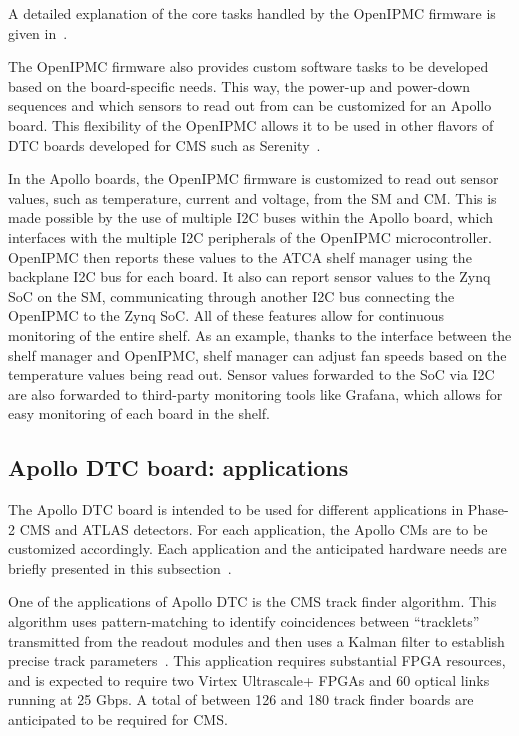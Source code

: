 A detailed explanation of the core tasks handled by the OpenIPMC firmware is given in~\cite{Calligaris:OpenIPMC}.

The OpenIPMC firmware also provides custom software tasks to be developed based on the board-specific needs.
This way, the power-up and power-down sequences and which sensors to read out from can be customized for an
Apollo board. This flexibility of the OpenIPMC allows it to be used in other flavors of DTC boards developed
for CMS such as Serenity~\cite{CMS:SerenityPaper}.

In the Apollo boards, the OpenIPMC firmware is customized to read out sensor values, such as temperature, 
current and voltage, from the SM and CM. 
This is made possible by the use of multiple I2C buses within the Apollo board, which
interfaces with the multiple I2C peripherals of the OpenIPMC microcontroller. OpenIPMC then reports these
values to the ATCA shelf manager using the backplane I2C bus for each board. It also can report sensor values
to the Zynq SoC on the SM, communicating through another I2C bus connecting the OpenIPMC to the Zynq SoC. 
All of these features allow for continuous 
monitoring of the entire shelf. As an example, thanks to the interface between the shelf manager and OpenIPMC,
shelf manager can adjust fan speeds based on the temperature values being read out. Sensor values forwarded to
the SoC via I2C are also forwarded to third-party monitoring tools like Grafana, which allows for easy monitoring
of each board in the shelf. 

\subsection{Apollo DTC board: applications}

The Apollo DTC board is intended to be used for different applications in Phase-2 CMS and ATLAS detectors.
For each application, the Apollo CMs are to be customized accordingly. Each application and the anticipated
hardware needs are briefly presented in this subsection~\cite{CMS:ApolloPaper}.

One of the applications of Apollo DTC is the CMS track finder algorithm. This algorithm uses 
pattern-matching to identify coincidences between “tracklets”
transmitted from the readout modules and then uses a Kalman filter to establish precise track 
parameters~\cite{CMS:ApolloPaper}. This application requires substantial FPGA resources, and is expected
to require two Virtex Ultrascale+ FPGAs and 60 optical links running at 25 Gbps. A total of 
between 126 and 180 track finder boards are anticipated to be required for CMS.

